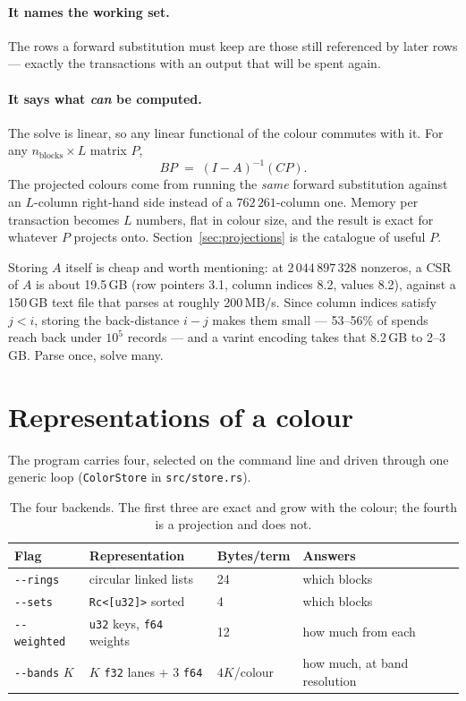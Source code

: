 \documentclass[11pt,a4paper]{article}
\newcommand{\flag}[1]{\texttt{-{}-#1}}
\begin{document}
\paragraph{It names the working set.} The rows a forward substitution must keep
are those still referenced by later rows --- exactly the transactions with an
output that will be spent again.

\paragraph{It says what \emph{can} be computed.} The solve is linear, so any
linear functional of the colour commutes with it. For any $n_{\text{blocks}}
\times L$ matrix $P$,
\begin{equation}
  BP \;=\; (I-A)^{-1}(CP).
  \label{eq:project}
\end{equation}
The projected colours come from running the \emph{same} forward substitution
against an $L$-column right-hand side instead of a $762\,261$-column one. Memory
per transaction becomes $L$ numbers, flat in colour size, and the result is
exact for whatever $P$ projects onto. Section~\ref{sec:projections} is the
catalogue of useful $P$.

Storing $A$ itself is cheap and worth mentioning: at $2\,044\,897\,328$
nonzeros, a CSR of $A$ is about 19.5\,GB (row pointers 3.1, column indices 8.2,
values 8.2), against a 150\,GB text file that parses at roughly 200\,MB/s. Since
column indices satisfy $j<i$, storing the back-distance $i-j$ makes them small
--- 53--56\% of spends reach back under $10^5$ records --- and a varint encoding
takes that 8.2\,GB to 2--3\,GB. Parse once, solve many.

\section{Representations of a colour}
\label{sec:representations}

The program carries four, selected on the command line and driven through one
generic loop (\texttt{ColorStore} in \texttt{src/store.rs}).

\begin{table}[t]
\centering
\begin{tabular}{llll}
\toprule
Flag & Representation & Bytes/term & Answers \\
\midrule
\flag{rings}    & circular linked lists   & 24 & which blocks \\
\flag{sets}     & \texttt{Rc<[u32]>} sorted & 4 & which blocks \\
\flag{weighted} & \texttt{u32} keys, \texttt{f64} weights & 12 & how much from each \\
\flag{bands} $K$ & $K$ \texttt{f32} lanes + 3 \texttt{f64} & $4K$/colour & how much, at band resolution \\
\bottomrule
\end{tabular}
\caption{The four backends. The first three are exact and grow with the colour;
the fourth is a projection and does not.}
\label{tab:backends}
\end{table}
\end{document}
